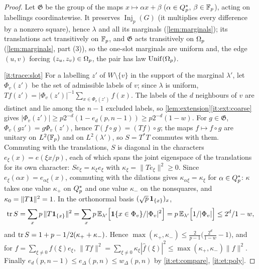 \begin{proof}
Let $\mathfrak G$ be the group of the maps $x\mapsto\alpha x+\beta$ ($\alpha\in Q_{p}^{*}$,
$\beta\in\mathbb F_p$), acting on labellings coordinatewise. It preserves
$\operatorname{Inj}_p(G)$ (it multiplies every difference by a nonzero square),
hence $\lambda$ and all its marginals (\cref{lem:marginals}); its translations act
transitively on $\mathbb F_p$, and $\mathfrak G$ acts transitively on $\Omega_{p}$
(\cref{lem:marginals}, part (3)), so the one-slot marginals are uniform and, the
edge $(u,v)$ forcing $(z_u,z_v)\in\Omega_{p}$, the pair has law $\operatorname{Unif}(\Omega_{p})$.

\ref{it:trace:slot} For a labelling $z'$ of $W\setminus\{v\}$ in the support of the
marginal $\lambda'$, let $\Phi_v(z')$ be the set of admissible labels of $v$; since
$\lambda$ is uniform, $Tf(z')=|\Phi_v(z')|^{-1}\sum_{x\in\Phi_v(z')}f(x)$. The labels
of the $d$ neighbours of $v$ are distinct and lie among the $n-1$ excluded
labels, so \cref{lem:extension}\ref{it:ext:coarse} gives
$|\Phi_v(z')|\ge p2^{-d}(1-e_d(p,n-1))\ge p2^{-d}(1-w)$. For $g\in\mathfrak G$,
$\Phi_v(gz')=g\Phi_v(z')$, hence $T(f\circ g)=(Tf)\circ g$; the maps $f\mapsto f\circ g$
are unitary on $L^2(\mathbb F_p)$ and on $L^2(\lambda')$, so $S=T^*T$ commutes with them.
Commuting with the translations, $S$ is diagonal in the characters
$e_\xi(x)=e(\xi x/p)$, each of which spans the joint eigenspace of the
translations for its own character: $Se_\xi=\kappa_\xi e_\xi$ with
$\kappa_\xi=\|Te_\xi\|^2\ge0$. Since $e_\xi(\alpha x)=e_{\alpha\xi}(x)$, commuting with
the dilations gives $\kappa_{\alpha\xi}=\kappa_\xi$ for $\alpha\in Q_{p}^{*}$: $\kappa$ takes one
value $\kappa_+$ on $Q_{p}^{*}$ and one value $\kappa_-$ on the nonsquares, and
$\kappa_0=\|T\mathbf 1\|^2=1$. In the orthonormal basis $(\sqrt p\,\mathbf 1_{\{x\}})_x$,
\[
 \operatorname{tr} S=\sum_xp\,\|T\mathbf 1_{\{x\}}\|^2
 =\sum_xp\,\mathbb E_{\lambda'}\Bigl[\mathbf 1\{x\in\Phi_v\}/|\Phi_v|^2\Bigr]
 =p\,\mathbb E_{\lambda'}\Bigl[1/|\Phi_v|\Bigr]\le2^d/1-w,
\]
and $\operatorname{tr} S=1+p-1/2(\kappa_++\kappa_-)$. Hence
$\max(\kappa_+,\kappa_-)\le\frac2{p-1}\bigl(\frac{2^d}{1-w}-1\bigr)$, and for
$f=\sum_{\xi\ne0}\widehat f(\xi)e_\xi$,
$\|Tf\|^2=\sum_{\xi\ne0}\kappa_\xi|\widehat f(\xi)|^2\le\max(\kappa_+,\kappa_-)\|f\|^2$.
Finally $e_d(p,n-1)\le e_\Delta(p,n)\le w_\Delta(p,n)$ by \ref{it:et:compare},
\ref{it:et:poly}.


\end{proof}

